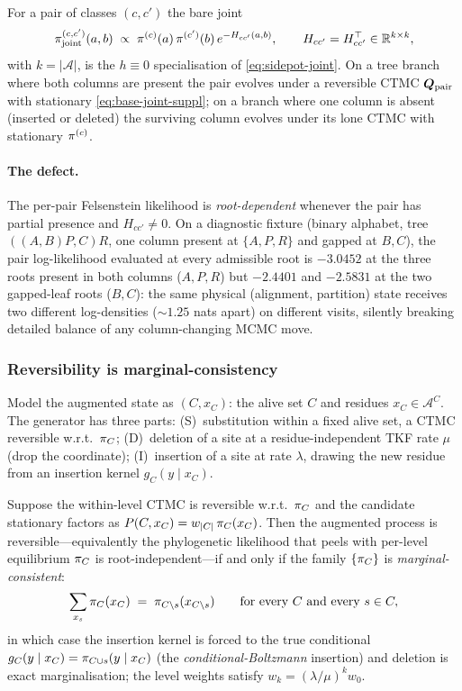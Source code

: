 For a pair of classes $(c,c')$ the bare joint
\begin{equation}
  \pi_{\mathrm{joint}}^{(c,c')}(a,b)\;\propto\;\pi^{(c)}(a)\,\pi^{(c')}(b)\,e^{-H_{cc'}(a,b)},
  \qquad H_{cc'} = H_{cc'}^\top \in \mathbb{R}^{k\times k},
  \label{eq:base-joint-suppl}
\end{equation}
with $k=|\mathcal A|$, is the $h\equiv 0$ specialisation of
\eqref{eq:sidepot-joint}. On a tree branch where both columns are
present the pair evolves under a reversible CTMC $\bm{Q}_{\mathrm{pair}}$
with stationary \eqref{eq:base-joint-suppl}; on a branch where one
column is absent (inserted or deleted) the surviving column evolves
under its lone CTMC with stationary $\pi^{(c)}$.

\paragraph{The defect.} The per-pair Felsenstein likelihood is
\emph{root-dependent} whenever the pair has partial presence and
$H_{cc'}\neq 0$. On a diagnostic fixture (binary alphabet, tree
$((A,B)P,C)R$, one column present at $\{A,P,R\}$ and gapped at
$B,C$), the pair log-likelihood evaluated at every admissible root
is $-3.0452$ at the three roots present in both columns ($A,P,R$)
but $-2.4401$ and $-2.5831$ at the two gapped-leaf roots ($B,C$):
the same physical (alignment, partition) state receives two
different log-densities ($\sim 1.25$ nats apart) on different
visits, silently breaking detailed balance of any
column-changing MCMC move.

\subsubsection{Reversibility is marginal-consistency}
\label{sec:revcond-suppl}

Model the augmented state as $(C, x_C)$: the alive set $C$ and
residues $x_C\in\mathcal A^{C}$. The generator has three parts:
(S)~substitution within a fixed alive set, a CTMC reversible
w.r.t.\ $\pi_C$; (D)~deletion of a site at a residue-independent
TKF rate $\mu$ (drop the coordinate); (I)~insertion of a site at
rate $\lambda$, drawing the new residue from an insertion kernel
$g_C(y\mid x_C)$.

\begin{theorem}
\label{thm:revcond}
Suppose the within-level CTMC is reversible w.r.t.\ $\pi_C$ and the
candidate stationary factors as $P(C,x_C)=w_{|C|}\,\pi_C(x_C)$.
Then the augmented process is reversible---equivalently the
phylogenetic likelihood that peels with per-level equilibrium
$\pi_C$ is root-independent---if and only if the family
$\{\pi_C\}$ is \emph{marginal-consistent}:
\begin{equation}
  \sum_{x_s}\pi_{C}(x_C) \;=\; \pi_{C\setminus s}(x_{C\setminus s})
  \qquad\text{for every }C\text{ and every }s\in C,
  \label{eq:marg-consistency}
\end{equation}
in which case the insertion kernel is forced to the true conditional
$g_C(y\mid x_C)=\pi_{C\cup s}(y\mid x_C)$ (the
\emph{conditional-Boltzmann} insertion) and deletion is exact
marginalisation; the level weights satisfy
$w_k=(\lambda/\mu)^k w_0$.
\end{theorem}


